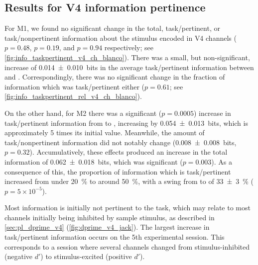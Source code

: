 \subsection{Results for \acs{V4} information pertinence}

For \ac{M1}, we found no significant change in the total, task\-/pertinent, or task\-/nonpertinent information about the stimulus encoded in \ac{V4} channels ($p=0.48$, $p=0.19$, and $p=0.94$ respectively; see \autoref{fig:info_taskpertinent_v4_ch_blanco}).
There was a small, but non-significant, increase of \SI{+0.014\pm0.010}{bits} in the average task\-/pertinent information between  and .
Correspondingly, there was no significant change in the fraction of information which was task\-/pertinent either ($p=0.61$; see \autoref{fig:info_taskpertinent_rel_v4_ch_blanco}).

On the other hand, for \ac{M2} there was a significant ($p=0.0005$) increase in task\-/pertinent information from  to , increasing by \SI{+0.054\pm0.013}{bits}, which is approximately \num{5} times its initial value.
Meanwhile, the amount of task\-/nonpertinent information did not notably change (\SI{+0.008\pm0.008}{bits}, $p=0.32$).
Accumulatively, these effects produced an increase in the total information of \SI{+0.062\pm0.018}{bits}, which was significant ($p=0.003$).
As a consequence of this, the proportion of information which is task\-/pertinent increased from under \SI{20}{\percent} to around \SI{50}{\percent}, with a swing from  to  of \SI{+33\pm3}{\percent} ($p=5 \times 10^{-5}$).

Most information is initially not pertinent to the task, which may relate to most channels initially being inhibited by sample stimulus, as described in \autoref{sec:pl_dprime_v4} (\autoref{fig:dprime_v4_jack}).
The largest increase in task\-/pertinent information occurs on the 5th experimental session.
This corresponds to a session where several channels changed from stimulus-inhibited (negative $d'$) to stimulus-excited (positive $d'$).


